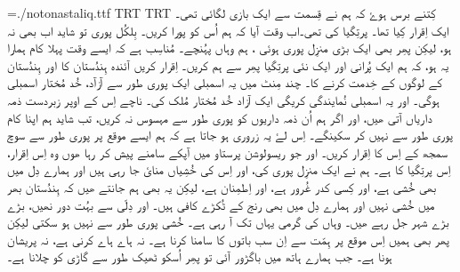 \pagewidth=210mm
\pageheight=297mm
\hsize=210mm
\hsize=190mm
\hoffset=10mm
\voffset=10mm
\nopagenumbers
\parindent=0mm
\font\noto={./notonastaliq.ttf}
\textdir TRT
\pardir TRT
\noto
کِتنے برس ہوۓ کہ ہم نے قِسمت سے ایک بازی لگائی تھی۔ ایک اِقرار کِیا تھا۔ پرتِگیا کی
تھی۔اب وقت آیا کہ ہم اُس کو پورا کریں۔ بِلکُل پوری تو شاید اب بھی نہ ہو، لیکِن پھِر
بھی ایک بڑی منزِل پوری ہوئی ، ہم وہاں پہُنچے۔ مُناسِب ہے کہ ایسے وقت پہلا کام ہمارا
یہ ہو، کہ ہم ایک پُرانی اور ایک نئی پرتِگیا پھِر سے ہم کریں۔ اِقرار کریں آئندہ
ہِندُستان کا اور ہِندُستان کے لوگوں کے خِدمت کرنے کا۔ چند مِنٹ میں یہ اسمبلی ایک پوری
طور سے آزآد، خُد مُختار اسمبلی ہوگی۔ اور یہ اسمبلی نُمایندگی کریگی ایک آزاد خُد
مُختار مُلک کی۔ ناچے اِس کے اوپر زبردست ذمہ داریاں آتی ھیں، اور اگر ہم اُن ذمہ
داریوں کو پوری طور سے مہسوس نہ کریں، تب شاید ہم اپنا کام پوری طور سے نہیں کر
سکینگے۔ اِس لۓ یہ زروری ہو جاتا ہے کہ ہم ایسے موقع پر پوری طور سے سوچ سمجھ کے اِس
کا اِقرار کریں۔ اور جو ریسولوشن پرستاو میں آپکے سامنے پیش کر رہا ھوں وہ اِس
اِقرار، اِس پرتِگیا کا ہے۔ ہم نے ایک منزِل پوری کی، اور اِس کی خُشِیاں منایٔ جا رہی ہیں
اور ہمارے دِل میں بھی خُشی ہے، اور کِسی کدر غُرور ہے، اور اِطمِنان ہے، لیکِن یہ بھی ہم
جانتے ھیں کہ ہِندُستان بھر میں خُشی نہیں اور ہمارے دِل میں بھی رنج کے ٹُکڑے کافی
ہیں۔ اور دِلّی سے بہُت دور نھیں، بڑے بڑے شہر جل رہے ھیں۔ وہاں کی گرمی یہاں تک آ
رہی ہے۔ خُشی پوری طور سے نہیں ہو سکتی لیکِن پھر بھی ہمیں اِس موقع پر ہِمّت سے اِن سب
باتوں کا سامنا کرنا ہے۔ نہ ہاے ہاے کرنی ہے، نہ پریشان ہونا ہے۔ جب ہمارے ہاتھ
میں باگڑور آئی تو پھِر اُسکو ٹھیک طور سے گاڑی کو چلانا ہے۔
\bye
